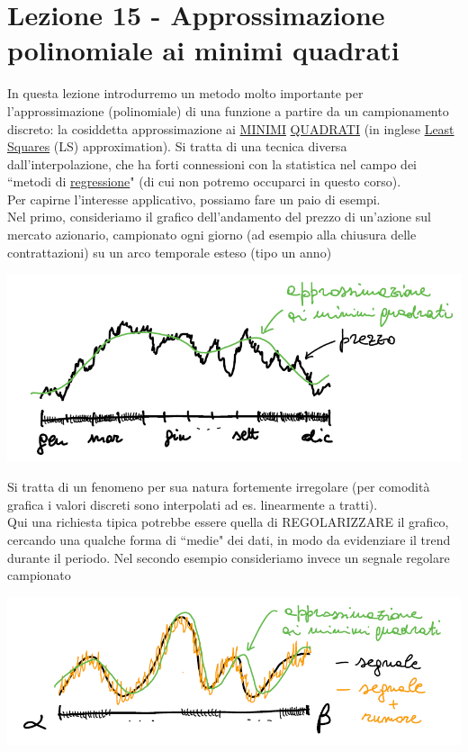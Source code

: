 \section{Lezione 15 - Approssimazione polinomiale ai minimi quadrati}
In questa lezione introdurremo un metodo molto importante per l'approssimazione (polinomiale) di una funzione a partire da un campionamento discreto: la cosiddetta approssimazione ai \uline{MINIMI} \uline{QUADRATI} (in inglese \uline{Least Squares} (LS) approximation). Si tratta di una tecnica diversa\\ dall'interpolazione, che ha forti connessioni con la statistica nel
campo dei ``metodi di \uline{regressione}" (di cui non potremo occuparci in questo corso).\\
Per capirne l'interesse applicativo, possiamo fare un paio di esempi.\\
Nel primo, consideriamo il grafico dell'andamento del prezzo di un'azione sul mercato azionario, campionato ogni giorno (ad esempio alla chiusura delle contrattazioni) su un arco temporale esteso (tipo un anno)
\begin{center}
    \includegraphics[scale=0.7]{foto/pag2}
\end{center}
Si tratta di un fenomeno per sua natura fortemente irregolare (per comodità grafica i valori discreti sono interpolati ad es. linearmente a tratti).\\
Qui una richiesta tipica potrebbe essere quella di REGOLARIZZARE il grafico, cercando una qualche forma di ``medie" dei dati, in modo da evidenziare il trend durante il periodo.
\newline\newline
Nel secondo esempio consideriamo invece un segnale regolare campionato
\begin{center}
    \includegraphics[scale=0.7]{foto/pag3}
\end{center}
